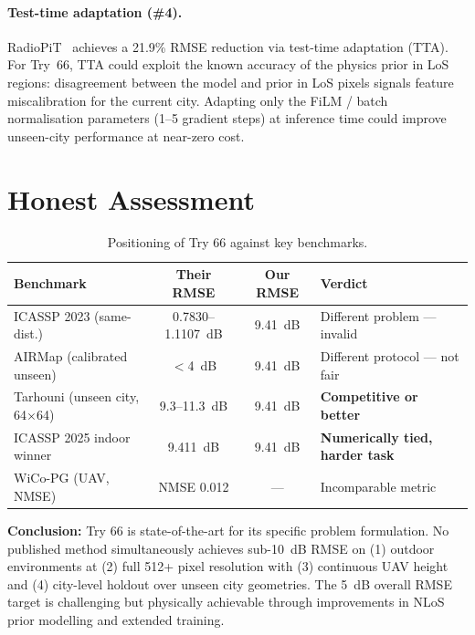 \documentclass[11pt,a4paper]{article}
\newcommand{\better}[1]{\textcolor{good}{\textbf{#1}}}
\begin{document}
\paragraph{Test-time adaptation (\#4).}
RadioPiT~\cite{radiopit2025} achieves a 21.9\% RMSE reduction via test-time
adaptation (TTA). For Try~66, TTA could exploit the known accuracy of the
physics prior in LoS regions: disagreement between the model and prior in LoS
pixels signals feature miscalibration for the current city. Adapting only the
FiLM / batch normalisation parameters (1--5 gradient steps) at inference time
could improve unseen-city performance at near-zero cost.

\section{Honest Assessment}
\label{sec:assessment}

\begin{table}[h!]
\centering
\caption{Positioning of Try 66 against key benchmarks.}
\label{tab:assessment}
\begin{tabularx}{\textwidth}{Xccl}
\toprule
\textbf{Benchmark} & \textbf{Their RMSE} & \textbf{Our RMSE} & \textbf{Verdict} \\
\midrule
ICASSP 2023 (same-dist.) & 0.7830--1.1107~dB & 9.41~dB & Different problem --- invalid \\
AIRMap (calibrated unseen) & $<$4~dB & 9.41~dB & Different protocol --- not fair \\
Tarhouni (unseen city, 64$\times$64) & 9.3--11.3~dB & 9.41~dB & \better{Competitive or better} \\
ICASSP 2025 indoor winner & 9.411~dB & 9.41~dB & \better{Numerically tied, harder task} \\
WiCo-PG (UAV, NMSE) & NMSE 0.012 & --- & Incomparable metric \\
\bottomrule
\end{tabularx}
\end{table}

\textbf{Conclusion:} Try 66 is state-of-the-art for its specific problem formulation.
No published method simultaneously achieves sub-10~dB RMSE on (1) outdoor environments
at (2) full 512+ pixel resolution with (3) continuous UAV height and (4) city-level
holdout over unseen city geometries. The 5~dB overall RMSE target is challenging but physically
achievable through improvements in NLoS prior modelling and extended training.
\end{document}
